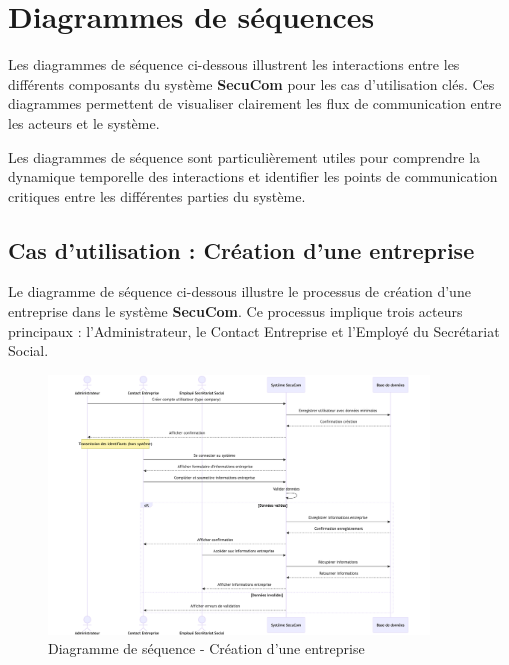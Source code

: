 \newpage

\section{Diagrammes de séquences}

\noindent Les diagrammes de séquence ci-dessous illustrent les interactions entre les différents composants du système \textbf{SecuCom} pour les cas d'utilisation clés. Ces diagrammes permettent de visualiser clairement les flux de communication entre les acteurs et le système.

\begin{note}
Les diagrammes de séquence sont particulièrement utiles pour comprendre la dynamique temporelle des interactions et identifier les points de communication critiques entre les différentes parties du système.
\end{note}

\subsection{Cas d'utilisation : Création d'une entreprise}

\noindent Le diagramme de séquence ci-dessous illustre le processus de création d'une entreprise dans le système \textbf{SecuCom}. Ce processus implique trois acteurs principaux : l'Administrateur, le Contact Entreprise et l'Employé du Secrétariat Social.

\begin{figure}[H]
\centering
\includegraphics[width=0.9\textwidth]{SD_creation_entreprise.png}
\caption{Diagramme de séquence - Création d'une entreprise}
\end{figure}

\vspace{0.5cm}

